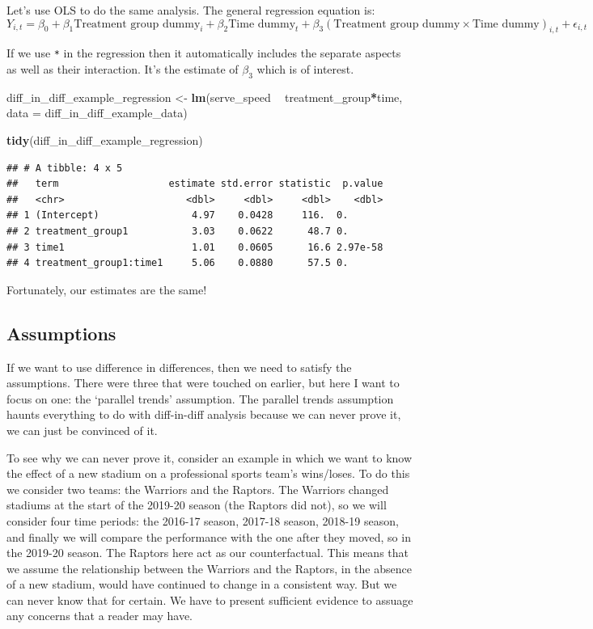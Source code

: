 \documentclass[
]{book}
\newenvironment{Shaded}{\begin{snugshade}}{\end{snugshade}}
\newcommand{\DataTypeTok}[1]{\textcolor[rgb]{0.13,0.29,0.53}{#1}}
\newcommand{\KeywordTok}[1]{\textcolor[rgb]{0.13,0.29,0.53}{\textbf{#1}}}
\newcommand{\NormalTok}[1]{#1}
\newcommand{\OperatorTok}[1]{\textcolor[rgb]{0.81,0.36,0.00}{\textbf{#1}}}
\newcommand{\StringTok}[1]{\textcolor[rgb]{0.31,0.60,0.02}{#1}}
\begin{document}
Let's use OLS to do the same analysis. The general regression equation is:
\[Y_{i,t} = \beta_0 + \beta_1\mbox{Treatment group dummy}_i + \beta_2\mbox{Time dummy}_t + \beta_3(\mbox{Treatment group dummy} \times\mbox{Time dummy})_{i,t} + \epsilon_{i,t}\]

If we use \texttt{*} in the regression then it automatically includes the separate aspects as well as their interaction. It's the estimate of \(\beta_3\) which is of interest.

\begin{Shaded}
\begin{Highlighting}[]
\NormalTok{diff_in_diff_example_regression <-}\StringTok{ }\KeywordTok{lm}\NormalTok{(serve_speed }\OperatorTok{~}\StringTok{ }\NormalTok{treatment_group}\OperatorTok{*}\NormalTok{time, }
                         \DataTypeTok{data =}\NormalTok{ diff_in_diff_example_data)}

\KeywordTok{tidy}\NormalTok{(diff_in_diff_example_regression)}
\end{Highlighting}
\end{Shaded}

\begin{verbatim}
## # A tibble: 4 x 5
##   term                   estimate std.error statistic  p.value
##   <chr>                     <dbl>     <dbl>     <dbl>    <dbl>
## 1 (Intercept)                4.97    0.0428     116.  0.      
## 2 treatment_group1           3.03    0.0622      48.7 0.      
## 3 time1                      1.01    0.0605      16.6 2.97e-58
## 4 treatment_group1:time1     5.06    0.0880      57.5 0.
\end{verbatim}

Fortunately, our estimates are the same!

\hypertarget{assumptions}{%
\subsection{Assumptions}\label{assumptions}}

If we want to use difference in differences, then we need to satisfy the assumptions. There were three that were touched on earlier, but here I want to focus on one: the `parallel trends' assumption. The parallel trends assumption haunts everything to do with diff-in-diff analysis because we can never prove it, we can just be convinced of it.

To see why we can never prove it, consider an example in which we want to know the effect of a new stadium on a professional sports team's wins/loses. To do this we consider two teams: the Warriors and the Raptors. The Warriors changed stadiums at the start of the 2019-20 season (the Raptors did not), so we will consider four time periods: the 2016-17 season, 2017-18 season, 2018-19 season, and finally we will compare the performance with the one after they moved, so in the 2019-20 season. The Raptors here act as our counterfactual. This means that we assume the relationship between the Warriors and the Raptors, in the absence of a new stadium, would have continued to change in a consistent way. But we can never know that for certain. We have to present sufficient evidence to assuage any concerns that a reader may have.
\end{document}

